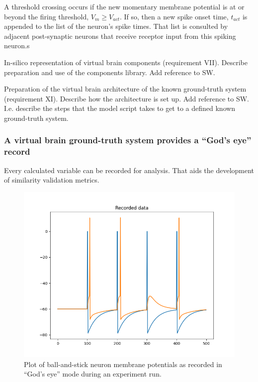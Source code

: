 \documentclass{ldr-article}
\begin{document}
A threshold crossing occurs if the new momentary membrane potential is at or beyond the firing threshold, $V_m \ge V_{act}$. If so, then a new spike onset time, $t_{act}$ is appended to the list of the neuron's spike times. That list is consulted by adjacent post-synaptic neurons that receive receptor input from this spiking neuron.s

In-silico representation of virtual brain components (requirement VII).
Describe preparation and use of the components library. Add reference to SW.

Preparation of the virtual brain architecture of the known ground-truth system (requirement XI).
Describe how the architecture is set up. Add reference to SW. I.e. describe the steps that the model script takes to get to a defined known ground-truth system.

\subsubsection{A virtual brain ground-truth system provides a ``God's eye'' record}

Every calculated variable can be recorded for analysis. That aids the development of similarity validation metrics.

\begin{figure}
	\centering
	\includegraphics[width=1\linewidth]{figures/e0_bs_recorded.png}
	\caption{Plot of ball-and-stick neuron membrane potentials as recorded in ``God's eye'' mode during an experiment run.
	}
	\label{fig:ball-and-stick}
\end{figure}
\end{document}
